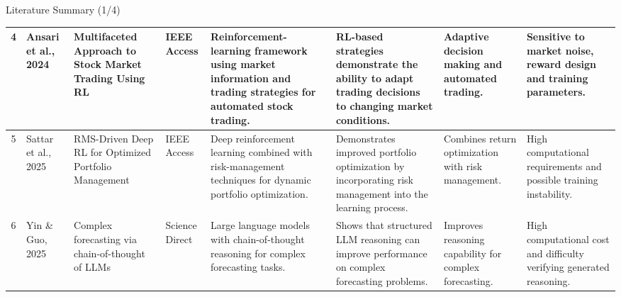 \documentclass{beamer}
\begin{document}
\begin{frame}{Literature Summary (1/4)}
{\begin{tabular}{c p{1.8cm} p{2.5cm} p{1.5cm} p{2.8cm} p{2.8cm} p{2.5cm} p{2.5cm}}
\midrule

4 &
Ansari et al., 2024 &
Multifaceted Approach to Stock Market Trading Using RL &
IEEE Access &
Reinforcement-learning framework using market information and trading strategies for automated stock trading. &
RL-based strategies demonstrate the ability to adapt trading decisions to changing market conditions. &
Adaptive decision making and automated trading. &
Sensitive to market noise, reward design and training parameters. \\

\midrule

5 &
Sattar et al., 2025 &
RMS-Driven Deep RL for Optimized Portfolio Management &
IEEE Access &
Deep reinforcement learning combined with risk-management techniques for dynamic portfolio optimization. &
Demonstrates improved portfolio optimization by incorporating risk management into the learning process. &
Combines return optimization with risk management. &
High computational requirements and possible training instability. \\

\midrule

6 &
Yin \& Guo, 2025 &
Complex forecasting via chain-of-thought of LLMs &
Science Direct &
Large language models with chain-of-thought reasoning for complex forecasting tasks. &
Shows that structured LLM reasoning can improve performance on complex forecasting problems. &
Improves reasoning capability for complex forecasting. &
High computational cost and difficulty verifying generated reasoning. \\

\bottomrule
\end{tabular}%
}

\end{frame}
\end{document}
